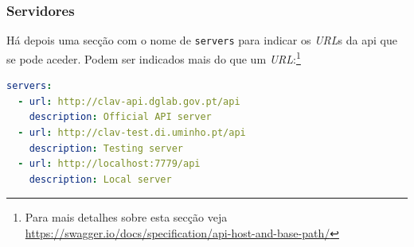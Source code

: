 \vspace{-0.7cm}

\subsubsection{Servidores}
Há depois uma secção com o nome de \texttt{servers} para indicar os \textit{URL}s da \acrshort{api} que se pode aceder. Podem ser indicados mais do que um \textit{URL}:\footnote{Para mais detalhes sobre esta secção veja \url{https://swagger.io/docs/specification/api-host-and-base-path/}}
\begin{lstlisting}[language=yaml, caption=Exemplo de secção \texttt{servers} indicando os \textit{URL}s e a descrição de cada na especificação \textit{OpenAPI}]
servers:
  - url: http://clav-api.dglab.gov.pt/api
    description: Official API server
  - url: http://clav-test.di.uminho.pt/api
    description: Testing server
  - url: http://localhost:7779/api
    description: Local server
\end{lstlisting}

\vspace{-0.7cm}

